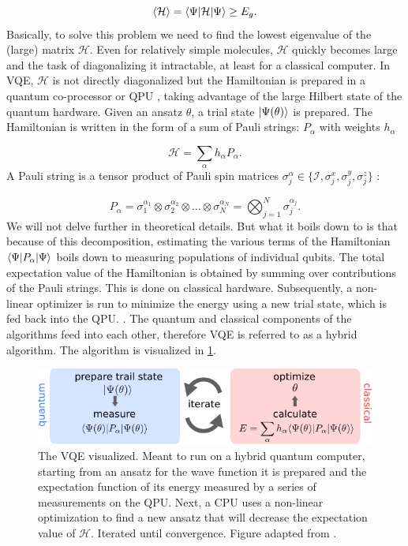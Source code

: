 \begin{equation}\label{eq:VariationalPrinciple}
	\left\langle \mathcal{H} \right\rangle = \langle\Psi\rvert\mathcal{H} \lvert\Psi\rangle \geq E_g.
\end{equation}
Basically, to solve this problem we need to find the lowest eigenvalue of the (large) matrix $\mathcal{H}$. 
Even for relatively simple molecules, $\mathcal{H}$ quickly becomes large and the task of diagonalizing it intractable, at least for a classical computer.
In \ac{VQE}, $\mathcal{H}$ is not directly diagonalized but the Hamiltonian is prepared in a quantum co-processor or \ac{QPU} \cite{Henriet2020,Peruzzo2014}, taking advantage of the large Hilbert state of the quantum hardware.
Given an ansatz $\theta$, a trial state $\lvert\Psi(\theta)\rangle$ is prepared.
The Hamiltonian is written in the form of a sum of Pauli strings: $P_{\alpha}$ with weights $h_{\alpha}$ \cite{McClean2016,Moll2018}

\begin{equation}
	\mathcal{H} = \sum_{\alpha} h_{\alpha} P_{\alpha}.
\end{equation}
A Pauli string is a tensor product of Pauli spin matrices $\sigma_j^{\alpha} \in \{\mathcal{I}, \sigma_j^x, \sigma_j^y, \sigma_j^z\}$ \cite{Griffiths2004}:

\begin{equation}\label{eq:PauliString}
	P_{\alpha} = 
	\sigma_1^{\alpha_1} \otimes \sigma_2^{\alpha_2} \otimes \ldots \otimes \sigma_N^{\alpha_N} = 
	\bigotimes_{j=1}^N \sigma_j^{\alpha_j}.
\end{equation}
We will not delve further in theoretical details. 
But what it boils down to is that because of this decomposition, estimating the various terms of the Hamiltonian $\langle\Psi\rvert P_{\alpha} \lvert\Psi\rangle$ boils down to measuring populations of individual qubits.
The total expectation value of the Hamiltonian is obtained by summing over contributions of the Pauli strings.
This is done on classical hardware.
Subsequently, a non-linear optimizer is run to minimize the energy using a new trial state, which is fed back into the \ac{QPU}.
\cite{Moll2018}. 
The quantum and classical components of the algorithms feed into each other, therefore \ac{VQE} is referred to as a hybrid algorithm. 
The algorithm is visualized in \cref{fig:VQE}.

\begin{figure}
	\centering
	\includegraphics[width=0.75\linewidth]{figures/VQE.pdf}
	\caption{The \ac{VQE} visualized. 
	Meant to run on a hybrid quantum computer, starting from an ansatz for the wave function it is prepared and the expectation function of its energy measured by a series of measurements on the \ac{QPU}.
	Next, a CPU uses a non-linear optimization to find a new ansatz that will decrease the expectation value of $\mathcal{H}$. Iterated until convergence. Figure adapted from \cite{Moll2018}.}
	\label{fig:VQE}
\end{figure}


